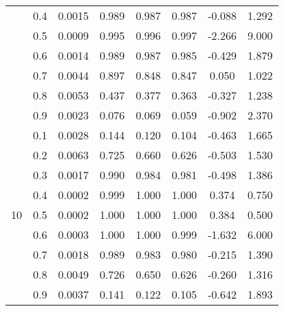 \documentclass[11pt,a4paper]{report}
\begin{document}
\begin{longtable}{ | c | c || c | c | c | c | c | c | }
 & 0.4 & 0.0015 & 0.989 & 0.987 & 0.987 & -0.088 & 1.292 \\
 & 0.5 & 0.0009 & 0.995 & 0.996 & 0.997 & -2.266 & 9.000 \\
 & 0.6 & 0.0014 & 0.989 & 0.987 & 0.985 & -0.429 & 1.879 \\
 & 0.7 & 0.0044 & 0.897 & 0.848 & 0.847 & 0.050 & 1.022 \\
 & 0.8 & 0.0053 & 0.437 & 0.377 & 0.363 & -0.327 & 1.238 \\
 & 0.9 & 0.0023 & 0.076 & 0.069 & 0.059 & -0.902 & 2.370 \\
 \hline
\multirow{9}{*}{10} & 0.1 & 0.0028 & 0.144 & 0.120 & 0.104 & -0.463 & 1.665 \\
 & 0.2 & 0.0063 & 0.725 & 0.660 & 0.626 & -0.503 & 1.530 \\
 & 0.3 & 0.0017 & 0.990 & 0.984 & 0.981 & -0.498 & 1.386 \\
 & 0.4 & 0.0002 & 0.999 & 1.000 & 1.000 & 0.374 & 0.750 \\
 & 0.5 & 0.0002 & 1.000 & 1.000 & 1.000 & 0.384 & 0.500 \\
 & 0.6 & 0.0003 & 1.000 & 1.000 & 0.999 & -1.632 & 6.000 \\
 & 0.7 & 0.0018 & 0.989 & 0.983 & 0.980 & -0.215 & 1.390 \\
 & 0.8 & 0.0049 & 0.726 & 0.650 & 0.626 & -0.260 & 1.316 \\
 & 0.9 & 0.0037 & 0.141 & 0.122 & 0.105 & -0.642 & 1.893 \\
 \hline
\hline
\end{longtable}
\end{document}
